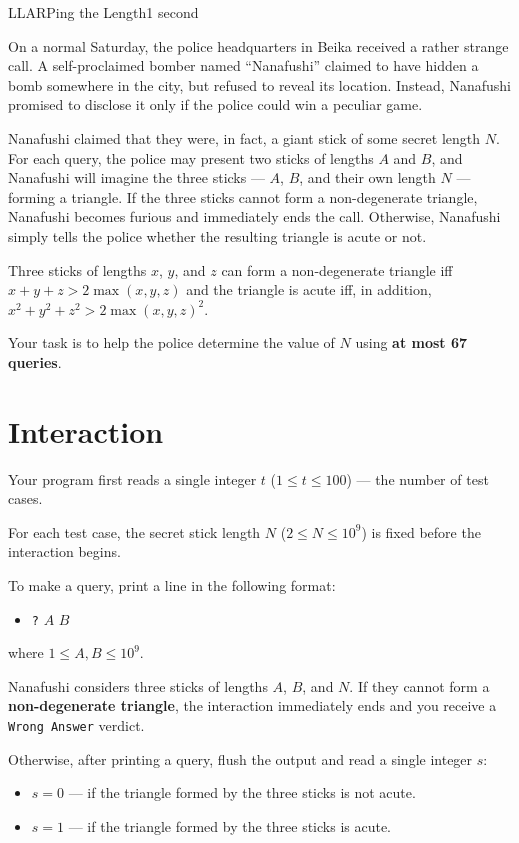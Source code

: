\begin{problem}{L}{LARPing the Length}{1 second}

\noindent
On a normal Saturday, the police headquarters in Beika received a rather strange call. A self-proclaimed bomber named ``Nanafushi'' claimed to have hidden a bomb somewhere in the city, but refused to reveal its location. Instead, Nanafushi promised to disclose it only if the police could win a peculiar game.

\noindent
Nanafushi claimed that they were, in fact, a giant stick of some secret length $N$. For each query, the police may present two sticks of lengths $A$ and $B$, and Nanafushi will imagine the three sticks --- $A$, $B$, and their own length $N$ --- forming a triangle. If the three sticks cannot form a non-degenerate triangle, Nanafushi becomes furious and immediately ends the call. Otherwise, Nanafushi simply tells the police whether the resulting triangle is acute or not.

\noindent
Three sticks of lengths $x$, $y$, and $z$ can form a non-degenerate triangle iff $x+y+z>2 \max(x,y,z)$ and the triangle is acute iff, in addition, $x^2+y^2+z^2>2 \max(x,y,z)^2$.

\noindent
Your task is to help the police determine the value of $N$ using \textbf{at most 67 queries}.

\section*{\sffamily Interaction}

\noindent
Your program first reads a single integer $t$ ($1 \le t \le 100$) --- the number of test cases.

\noindent
For each test case, the secret stick length $N$ ($2 \le N \le 10^9$) is fixed before the interaction begins.

\noindent
To make a query, print a line in the following format:
\begin{itemize}
\item \texttt{?} $A$ $B$
\end{itemize}

\noindent
where $1 \le A,B \le 10^9$.

\noindent
Nanafushi considers three sticks of lengths $A$, $B$, and $N$. If they cannot form a \textbf{non-degenerate triangle}, the interaction immediately ends and you receive a \texttt{Wrong Answer} verdict.

\noindent
Otherwise, after printing a query, flush the output and read a single integer $s$:
\begin{itemize}
\item $s = 0$ --- if the triangle formed by the three sticks is not acute.
\item $s = 1$ --- if the triangle formed by the three sticks is acute.
\end{itemize}


\end{problem}
